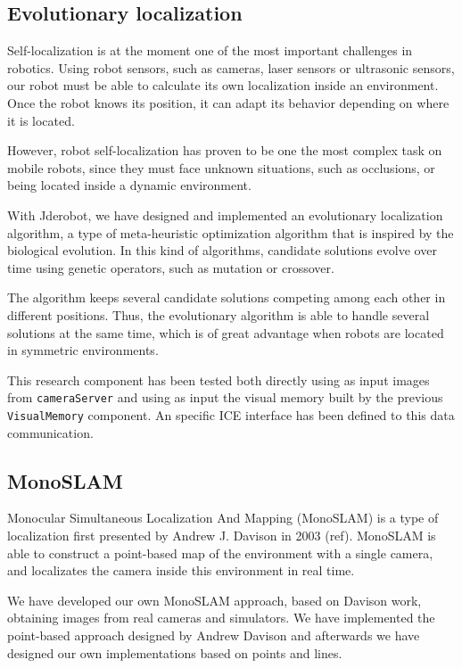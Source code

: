 \documentclass[twocolumn]{svjour3}          %
\begin{document}
\subsection{Evolutionary localization}

Self-localization is at the moment one of the most important challenges in robotics. Using robot sensors, such as cameras, laser sensors or ultrasonic sensors, our robot must be able to calculate its own localization inside an environment. Once the robot knows its position, it can adapt its behavior depending on where it is located. 
 
However, robot self-localization has proven to be one the most complex task on mobile robots, since they must face unknown situations, such as occlusions, or being located inside a dynamic environment.

With Jderobot, we have designed and implemented an evolutionary localization algorithm, a type of meta-heuristic optimization algorithm that is inspired by the biological evolution. In this kind of algorithms, candidate solutions evolve over time using genetic operators, such as mutation or crossover. 

The algorithm keeps several candidate solutions competing among each other in different positions. Thus, the evolutionary algorithm is able to handle several solutions at the same time, which is of great advantage when robots are located in symmetric environments.  

This research component has been tested both directly using as input images from \texttt{cameraServer} and using as input the visual memory built by the previous \texttt{VisualMemory} component. An specific ICE interface has been defined to this data communication.

\subsection{MonoSLAM}

Monocular Simultaneous Localization And Mapping (MonoSLAM) is a type of localization first presented by Andrew J. Davison in 2003 (ref). MonoSLAM is able to construct a point-based map of the environment with a single camera, and localizates the camera inside this environment in real time.

We have developed our own MonoSLAM approach, based on Davison work, obtaining images from real cameras and simulators. We have implemented the point-based approach designed by Andrew Davison and afterwards we have designed our own implementations based on points and lines.
\end{document}
